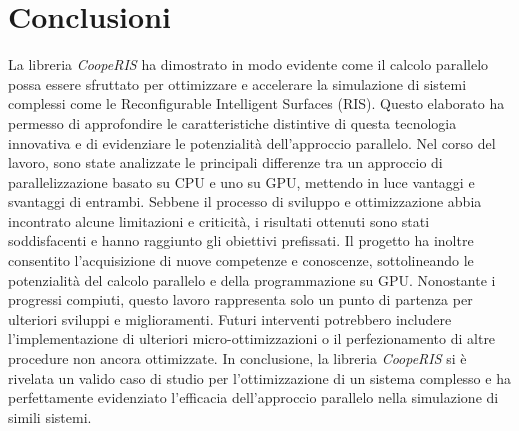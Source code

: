 \chapter{Conclusioni}
\label{cha:conclusioni}

La libreria \textit{CoopeRIS} ha dimostrato in modo evidente come il calcolo parallelo
possa essere sfruttato per ottimizzare e accelerare la simulazione di sistemi complessi
come le Reconfigurable Intelligent Surfaces (RIS). Questo elaborato ha permesso
di approfondire le caratteristiche distintive di questa tecnologia innovativa e
di evidenziare le potenzialità dell'approccio parallelo. Nel corso del lavoro,
sono state analizzate le principali differenze tra un approccio di
parallelizzazione basato su CPU e uno su GPU, mettendo in luce vantaggi e svantaggi
di entrambi. Sebbene il processo di sviluppo e ottimizzazione abbia incontrato
alcune limitazioni e criticità, i risultati ottenuti sono stati soddisfacenti e hanno
raggiunto gli obiettivi prefissati. Il progetto ha inoltre consentito l'acquisizione
di nuove competenze e conoscenze, sottolineando le potenzialità del calcolo parallelo
e della programmazione su GPU. Nonostante i progressi compiuti, questo lavoro rappresenta
solo un punto di partenza per ulteriori sviluppi e miglioramenti. Futuri
interventi potrebbero includere l'implementazione di ulteriori micro-ottimizzazioni
o il perfezionamento di altre procedure non ancora ottimizzate. In conclusione,
la libreria \textit{CoopeRIS} si è rivelata un valido caso di studio per l'ottimizzazione
di un sistema complesso e ha perfettamente evidenziato l'efficacia dell'approccio
parallelo nella simulazione di simili sistemi.